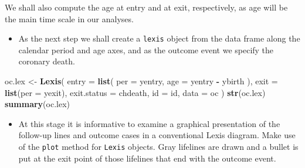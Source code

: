 \documentclass[
]{book}
\newenvironment{Shaded}{\begin{snugshade}}{\end{snugshade}}
\newcommand{\AttributeTok}[1]{\textcolor[rgb]{0.13,0.29,0.53}{#1}}
\newcommand{\FunctionTok}[1]{\textcolor[rgb]{0.13,0.29,0.53}{\textbf{#1}}}
\newcommand{\NormalTok}[1]{#1}
\newcommand{\OtherTok}[1]{\textcolor[rgb]{0.56,0.35,0.01}{#1}}
\newcommand{\SpecialCharTok}[1]{\textcolor[rgb]{0.81,0.36,0.00}{\textbf{#1}}}
\providecommand{\tightlist}{%
  \setlength{\itemsep}{0pt}\setlength{\parskip}{0pt}}
\begin{document}
We shall also compute the age at entry and at exit, respectively,
as age will be the main time scale in our analyses.

\begin{Shaded}
\end{Shaded}

\begin{itemize}
\tightlist
\item
  As the next step we shall create a \texttt{lexis} object
  from the data frame along the calendar period and age axes,
  and as the outcome event we specify the coronary death.
\end{itemize}

\begin{Shaded}
\begin{Highlighting}[]
\NormalTok{oc.lex }\OtherTok{\textless{}{-}} \FunctionTok{Lexis}\NormalTok{(}
  \AttributeTok{entry =} \FunctionTok{list}\NormalTok{(}
    \AttributeTok{per =}\NormalTok{ yentry,}
    \AttributeTok{age =}\NormalTok{ yentry }\SpecialCharTok{{-}}\NormalTok{ ybirth}
\NormalTok{  ),}
  \AttributeTok{exit =} \FunctionTok{list}\NormalTok{(}\AttributeTok{per =}\NormalTok{ yexit),}
  \AttributeTok{exit.status =}\NormalTok{ chdeath,}
  \AttributeTok{id =}\NormalTok{ id, }\AttributeTok{data =}\NormalTok{ oc}
\NormalTok{)}
\FunctionTok{str}\NormalTok{(oc.lex)}
\FunctionTok{summary}\NormalTok{(oc.lex)}
\end{Highlighting}
\end{Shaded}

\begin{itemize}
\tightlist
\item
  At this stage it is informative to examine a graphical
  presentation of the follow-up lines and outcome cases in a conventional
  Lexis diagram. Make use of the \texttt{plot} method for \texttt{Lexis} objects.
  Gray lifelines are drawn and a bullet is put at the exit point of those lifelines
  that end with the outcome event.
\end{itemize}
\end{document}
